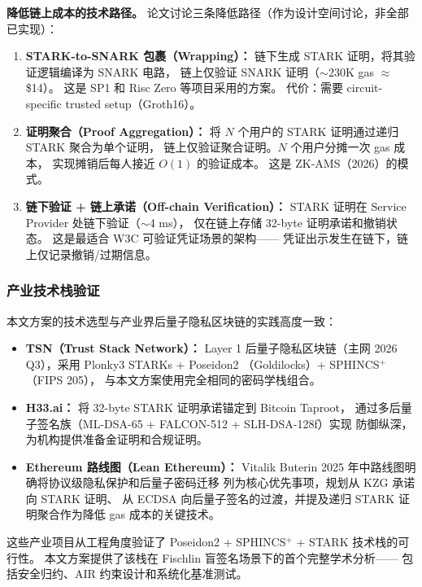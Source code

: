 \documentclass[11pt,a4paper]{ctexart}
\begin{document}
\textbf{降低链上成本的技术路径。}
论文讨论三条降低路径（作为设计空间讨论，非全部已实现）：

\begin{enumerate}[leftmargin=*]
\item \textbf{STARK-to-SNARK 包裹（Wrapping）：}
链下生成 STARK 证明，将其验证逻辑编译为 SNARK 电路，
链上仅验证 SNARK 证明（$\sim$230K gas $\approx$ \$14）。
这是 SP1 和 Risc Zero 等项目采用的方案。
代价：需要 circuit-specific trusted setup（Groth16）。
\item \textbf{证明聚合（Proof Aggregation）：}
将 $N$ 个用户的 STARK 证明通过递归 STARK 聚合为单个证明，
链上仅验证聚合证明。$N$ 个用户分摊一次 gas 成本，
实现摊销后每人接近 $O(1)$ 的验证成本。
这是 ZK-AMS（2026）的模式。
\item \textbf{链下验证 + 链上承诺（Off-chain Verification）：}
STARK 证明在 Service Provider 处链下验证（$\sim$4 ms），
仅在链上存储 32-byte 证明承诺和撤销状态。
这是最适合 W3C 可验证凭证场景的架构——
凭证出示发生在链下，链上仅记录撤销/过期信息。
\end{enumerate}

\subsubsection{产业技术栈验证}

本文方案的技术选型与产业界后量子隐私区块链的实践高度一致：

\begin{itemize}[leftmargin=*]
\item \textbf{TSN（Trust Stack Network）：}
Layer 1 后量子隐私区块链（主网 2026 Q3），采用 Plonky3 STARKs + Poseidon2
（Goldilocks）+ SPHINCS$^+$（FIPS 205），
与本文方案使用完全相同的密码学栈组合。
\item \textbf{H33.ai：}
将 32-byte STARK 证明承诺锚定到 Bitcoin Taproot，
通过多后量子签名族（ML-DSA-65 + FALCON-512 + SLH-DSA-128f）实现
防御纵深，为机构提供准备金证明和合规证明。
\item \textbf{Ethereum 路线图（Lean Ethereum）：}
Vitalik Buterin 2025 年中路线图明确将协议级隐私保护和后量子密码迁移
列为核心优先事项，规划从 KZG 承诺向 STARK 证明、
从 ECDSA 向后量子签名的过渡，并提及递归 STARK 证明聚合作为降低
gas 成本的关键技术。
\end{itemize}

这些产业项目从工程角度验证了 Poseidon2 + SPHINCS$^+$ + STARK 技术栈的可行性。
本文方案提供了该栈在 Fischlin 盲签名场景下的首个完整学术分析——
包括安全归约、AIR 约束设计和系统化基准测试。
\end{document}
